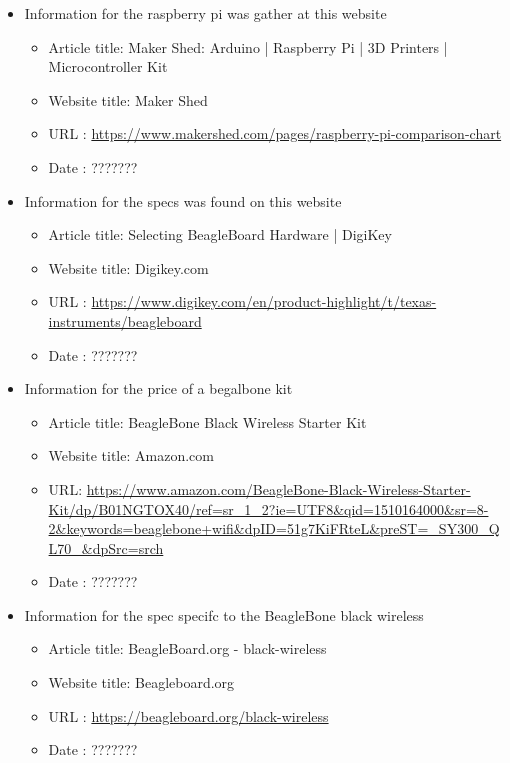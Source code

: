 \documentclass{article}
\begin{document}
\begin{thebibliography}{56}

    \begin{itemize}
        \item Information for the raspberry pi was gather at this website
        \begin{itemize}
            \item Article title: Maker Shed: Arduino | Raspberry Pi | 3D Printers | Microcontroller Kit
            \item Website title: Maker Shed
            \item URL          : \url{https://www.makershed.com/pages/raspberry-pi-comparison-chart}
            \item Date         : ???????
        \end{itemize}
    \end{itemize}

    \begin{itemize}
        \item Information for the specs was found on this website
        \begin{itemize}
            \item Article title: Selecting BeagleBoard Hardware | DigiKey
            \item Website title: Digikey.com
            \item URL          : \url{https://www.digikey.com/en/product-highlight/t/texas-instruments/beagleboard}
            \item Date         : ???????
        \end{itemize}

        \item Information for the price of a begalbone kit
        \begin{itemize}
            \item Article title: BeagleBone Black Wireless Starter Kit
            \item Website title: Amazon.com
            \item URL: \url{https://www.amazon.com/BeagleBone-Black-Wireless-Starter-Kit/dp/B01NGTOX40/ref=sr_1_2?ie=UTF8&qid=1510164000&sr=8-2&keywords=beaglebone+wifi&dpID=51g7KiFRteL&preST=_SY300_QL70_&dpSrc=srch}
            \item Date         : ???????
        \end{itemize}

        \item Information for the spec specifc to the BeagleBone black wireless
        \begin{itemize}
            \item Article title: BeagleBoard.org - black-wireless
            \item Website title: Beagleboard.org
            \item URL          : \url{https://beagleboard.org/black-wireless}
            \item Date         : ???????
        \end{itemize}


\end{itemize}
\end{thebibliography}
\end{document}
